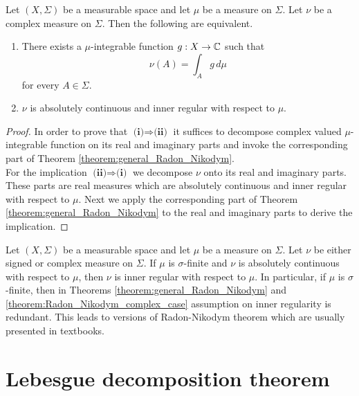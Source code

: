\begin{theorem}\label{theorem:Radon_Nikodym_complex_case}
    Let $(X,\Sigma)$ be a measurable space and let $\mu$ be a measure on $\Sigma$. Let $\nu$ be a complex measure on $\Sigma$. Then the following are equivalent.
    \begin{enumerate}[label=\emph{\textbf{(\roman*)}}, leftmargin=3.0em]
        \item There exists a $\mu$-integrable function $g:X\rightarrow {\mathbb C}$ such that
              $$\nu(A) = \int_Ag\,d\mu$$
              for every $A \in \Sigma$.
        \item $\nu$ is absolutely continuous and inner regular with respect to $\mu$.
    \end{enumerate}
\end{theorem}
\begin{proof}
    In order to prove that $\textbf{(i)}\Rightarrow \textbf{(ii)}$ it suffices to decompose complex valued $\mu$-integrable function on its real and imaginary parts and invoke the corresponding part of Theorem \ref{theorem:general_Radon_Nikodym}.\\
    For the implication $\textbf{(ii)}\Rightarrow \textbf{(i)}$ we decompose $\nu$ onto its real and imaginary parts. These parts are real measures which are absolutely continuous and inner regular with respect to $\mu$. Next we apply the corresponding part of Theorem \ref{theorem:general_Radon_Nikodym} to the real and imaginary parts to derive the implication.
\end{proof}

\begin{remark}\label{remark:Radon_Nikodym_for_sigma_finite_measures}
    Let $(X,\Sigma)$ be a measurable space and let $\mu$ be a measure on $\Sigma$. Let $\nu$ be either signed or complex measure on $\Sigma$. If $\mu$ is $\sigma$-finite and $\nu$ is absolutely continuous with respect to $\mu$, then $\nu$ is inner regular with respect to $\mu$. In particular, if $\mu$ is $\sigma$-finite, then in Theorems \ref{theorem:general_Radon_Nikodym} and \ref{theorem:Radon_Nikodym_complex_case} assumption on inner regularity is redundant. This leads to versions of Radon-Nikodym theorem which are usually presented in textbooks.
\end{remark}

\section{Lebesgue decomposition theorem}

